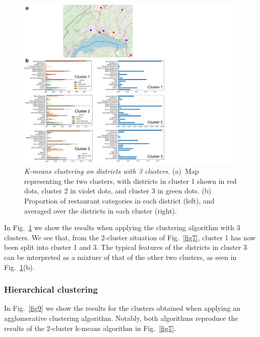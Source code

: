 \documentclass[12pt]{article}
\begin{document}
\begin{figure}
\begin{center}
\includegraphics[width=\textwidth]{Figures/Fig8}
\caption{\label{fig8} \emph{K-means clustering on districts with 3 clusters.} (a)~Map representing the two clusters, with districts in cluster 1 shown in red dots, cluster 2 in violet dots, and cluster 3 in green dots. (b) Proportion of restaurant categories in each district (left), and averaged over the districts in each cluster (right).}
\end{center}
\end{figure}

In Fig.~\ref{fig8} we show the results when applying the clustering algorithm with 3 clusters. We see that, from the 2-cluster situation of Fig.~\ref{fig7}, cluster 1 has now been split into cluster 1 and 3. The typical features of the districts in cluster 3 can be interpreted as a mixture of that of the other two clusters, as seen in Fig.~\ref{fig8}(b).  


\subsubsection{Hierarchical clustering}

In Fig.~\ref{fig9} we show the results for the clusters obtained when applying an agglomerative clustering algorithm. Notably, both algorithms reproduce the results of the 2-cluster k-means algorithm in Fig.~\ref{fig7}.
\end{document}
